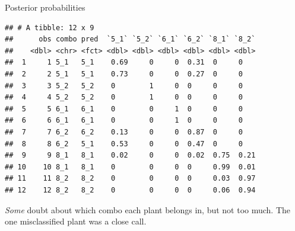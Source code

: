 \documentclass[
  ignorenonframetext,
]{beamer}
\newenvironment{Shaded}{\begin{snugshade}}{\end{snugshade}}
\newcommand{\DataTypeTok}[1]{\textcolor[rgb]{0.13,0.29,0.53}{#1}}
\newcommand{\DecValTok}[1]{\textcolor[rgb]{0.00,0.00,0.81}{#1}}
\newcommand{\KeywordTok}[1]{\textcolor[rgb]{0.13,0.29,0.53}{\textbf{#1}}}
\newcommand{\NormalTok}[1]{#1}
\newcommand{\OperatorTok}[1]{\textcolor[rgb]{0.81,0.36,0.00}{\textbf{#1}}}
\newcommand{\StringTok}[1]{\textcolor[rgb]{0.31,0.60,0.02}{#1}}
\begin{document}
\begin{frame}[fragile]{Posterior probabilities}
\protect\hypertarget{posterior-probabilities-1}{}

\scriptsize

\begin{Shaded}
\end{Shaded}

\begin{verbatim}
## # A tibble: 12 x 9
##      obs combo pred  `5_1` `5_2` `6_1` `6_2` `8_1` `8_2`
##    <dbl> <chr> <fct> <dbl> <dbl> <dbl> <dbl> <dbl> <dbl>
##  1     1 5_1   5_1    0.69     0     0  0.31  0     0   
##  2     2 5_1   5_1    0.73     0     0  0.27  0     0   
##  3     3 5_2   5_2    0        1     0  0     0     0   
##  4     4 5_2   5_2    0        1     0  0     0     0   
##  5     5 6_1   6_1    0        0     1  0     0     0   
##  6     6 6_1   6_1    0        0     1  0     0     0   
##  7     7 6_2   6_2    0.13     0     0  0.87  0     0   
##  8     8 6_2   5_1    0.53     0     0  0.47  0     0   
##  9     9 8_1   8_1    0.02     0     0  0.02  0.75  0.21
## 10    10 8_1   8_1    0        0     0  0     0.99  0.01
## 11    11 8_2   8_2    0        0     0  0     0.03  0.97
## 12    12 8_2   8_2    0        0     0  0     0.06  0.94
\end{verbatim}

\normalsize

\emph{Some} doubt about which combo each plant belongs in, but not too
much. The one misclassified plant was a close call.

\end{frame}
\end{document}
